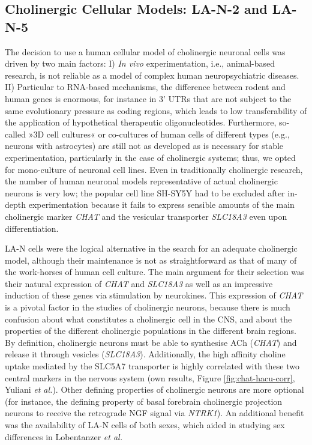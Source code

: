 \subsection{Cholinergic Cellular Models: LA-N-2 and LA-N-5}
The decision to use a human cellular model of cholinergic neuronal cells was driven by two main factors: I) \emph{In vivo} experimentation, i.e., animal-based research, is not reliable as a model of complex human neuropsychiatric diseases.\cite{Nestler2010, Drummond2017, Sommer2017} II) Particular to RNA-based mechanisms, the difference between rodent and human genes is enormous, for instance in 3' UTRs that are not subject to the same evolutionary pressure as coding regions, which leads to low transferability of the application of hypothetical therapeutic oligonucleotides.\cite{Mor2013} Furthermore, so-called »3D cell cultures« or co-cultures of human cells of different types (e.g., neurons with astrocytes) are still not as developed as is necessary for stable experimentation, particularly in the case of cholinergic systems;\cite{Watson2017} thus, we opted for mono-culture of neuronal cell lines. Even in traditionally cholinergic research, the number of human neuronal models representative of actual cholinergic neurons is very low; the popular cell line SH-SY5Y had to be excluded after in-depth experimentation because it fails to express sensible amounts of the main cholinergic marker \emph{CHAT} and the vesicular transporter \emph{SLC18A3} even upon differentiation.\cite{Korecka2013}

LA-N cells were the logical alternative in the search for an adequate cholinergic model, although their maintenance is not as straightforward as that of many of the work-horses of human cell culture. The main argument for their selection was their natural expression of \emph{CHAT} and \emph{SLC18A3} as well as an impressive induction of these genes via stimulation by neurokines. This expression of \emph{CHAT} is a pivotal factor in the studies of cholinergic neurons, because there is much confusion about what constitutes a cholinergic cell in the CNS, and about the properties of the different cholinergic populations in the different brain regions. By definition, cholinergic neurons must be able to synthesise ACh (\emph{CHAT}) and release it through vesicles (\emph{SLC18A3}). Additionally, the high affinity choline uptake mediated by the SLC5A7 transporter is highly correlated with these two central markers in the nervous system (own results, Figure \ref{fig:chat-hacu-corr}, Yuliani \emph{et al.}\cite{Yuliani2020}). Other defining properties of cholinergic neurons are more optional (for instance, the defining property of basal forebrain cholinergic projection neurons to receive the retrograde NGF signal via \emph{NTRK1}). An additional benefit was the availability of LA-N cells of both sexes, which aided in studying sex differences in Lobentanzer \emph{et al.}\cite{Lobentanzer2019a}

